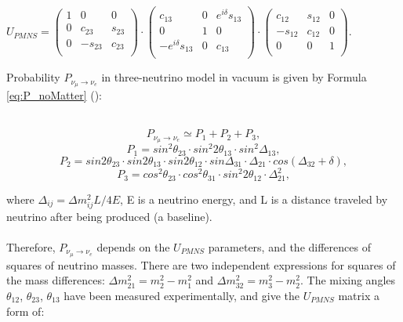 \begin{center}
$U_{PMNS} =
 \begin{pmatrix}
  1 & 0 & 0 \\
  0 & c_{23} & s_{23} \\
  0 & -s_{23} & c_{23} \\
 \end{pmatrix}
 \cdot
 \begin{pmatrix}
  c_{13} & 0 & e^{i\delta}s_{13} \\
  0 & 1 & 0 \\
  -e^{i\delta}s_{13} & 0 & c_{13} \\
 \end{pmatrix}
 \cdot
 \begin{pmatrix}
  c_{12} & s_{12} & 0 \\
  -s_{12} & c_{12} & 0 \\
  0 & 0 & 1 \\
 \end{pmatrix}$. \\
\end{center}
Probability $P_{\nu_\mu \rightarrow \nu_e}$ in three-neutrino model in vacuum is given by Formula \ref{eq:P_noMatter} (\cite{ref_theory_Osc}): \\ \\
\begin{center}
\begin{equation}
\label{eq:P_noMatter}
P_{\nu_\mu \rightarrow \nu_e} \simeq P_1 + P_2 + P_3, 
\end{equation}
\begin{equation}
\label{eq:P_noMatter_1}
P_1 = sin^2{\theta_{23}} \cdot sin^2{2\theta_{13}} \cdot sin^2{\Delta_{13}},
\end{equation}
\begin{equation}
\label{eq:P_noMatter_2}
P_2 = sin2\theta_{23} \cdot sin2\theta_{13} \cdot sin2\theta_{12} \cdot sin{\Delta_{31}} \cdot \Delta_{21} \cdot cos(\Delta_{32}+\delta),
\end{equation}
\begin{equation}
\label{eq:P_noMatter_3}
P_3 = cos^2\theta_{23} \cdot cos^2\theta_{31} \cdot sin^2{2\theta_{12}} \cdot \Delta^2_{21},
\end{equation}
\end{center}
where $\Delta_{ij}={\Delta}m^2_{ij}L/4E$, E is a neutrino energy, and L is a distance traveled by neutrino after being produced (a baseline).\\ \\
Therefore, $P_{\nu_\mu \rightarrow \nu_e}$ depends on the $U_{PMNS}$ parameters, and the differences of squares of neutrino masses. There are two independent expressions for squares of the mass differences: ${\Delta}m_{21}^2 = m_2^2-m_1^2$ and ${\Delta}m_{32}^2 = m_3^2-m_2^2$. The mixing angles $\theta_{12}$, $\theta_{23}$, $\theta_{13}$ have been measured experimentally, and give the $U_{PMNS}$ matrix a form of:\\
